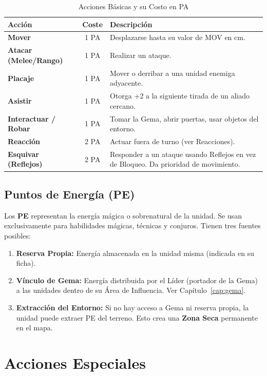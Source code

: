 \begin{table}[h]
\centering
\begin{tabularx}{\linewidth}{|l|c|X|}
\hline
\rowcolor{GoldRule!25} \textbf{Acción} & \textbf{Coste} & \textbf{Descripción} \\ \hline
\textbf{Mover} & 1 PA & Desplazarse hasta su valor de MOV en cm. \\ \hline
\textbf{Atacar (Melee/Rango)} & 1 PA & Realizar un ataque. \\ \hline
\textbf{Placaje} & 1 PA & Mover o derribar a una unidad enemiga adyacente. \\ \hline
\textbf{Asistir} & 1 PA & Otorga +2 a la siguiente tirada de un aliado cercano. \\ \hline
\textbf{Interactuar / Robar} & 1 PA & Tomar la Gema, abrir puertas, usar objetos del entorno. \\ \hline
\textbf{Reacción} & 2 PA & Actuar fuera de turno (ver Reacciones). \\ \hline
\textbf{Esquivar (Reflejos)} & 2 PA & Responder a un ataque usando Reflejos en vez de Bloqueo. Da prioridad de movimiento. \\ \hline
\end{tabularx}
\caption{Acciones Básicas y su Costo en PA}
\end{table}

\subsection{Puntos de Energía (PE)}

Los \textbf{PE} representan la energía mágica o sobrenatural de la unidad. Se usan exclusivamente para habilidades mágicas, técnicas y conjuros. Tienen tres fuentes posibles:

\begin{enumerate}
    \item \textbf{Reserva Propia:} Energía almacenada en la unidad misma (indicada en su ficha).
    \item \textbf{Vínculo de Gema:} Energía distribuida por el Líder (portador de la Gema) a las unidades dentro de su Área de Influencia. Ver Capítulo~\ref{cap:gema}.
    \item \textbf{Extracción del Entorno:} Si no hay acceso a Gema ni reserva propia, la unidad puede extraer PE del terreno. Esto crea una \textbf{Zona Seca} permanente en el mapa.
\end{enumerate}

\section{Acciones Especiales}


